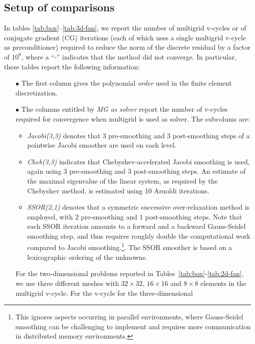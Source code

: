 \documentclass[smallcondensed,final]{svjour3}     %
\begin{document}
\subsection{Setup of comparisons}\label{subsec:measures}
In tables \ref{tab:box}--\ref{tab:3d-fan}, we report the number of
multigrid v-cycles or of conjugate gradient (CG) iterations (each of
which uses a single multigrid v-cycle as preconditioner) required to
reduce the norm of the discrete residual by a factor of $10^8$, where
a ``-'' indicates that the method did not converge. In particular,
these tables report the following information:
\begin{itemize}
\item[$\bullet$] The first column gives the polynomial \emph{order}
  used in the finite element discretization.
\item[$\bullet$] The columns entitled by \emph{MG as solver} report
  the number of v-cycles required for convergence when multigrid is used as
  solver. The subcolums are:
  \begin{itemize}
  \item \emph{Jacobi(3,3)} denotes that 3 pre-smoothing and 3
    post-smoothing steps of a pointwise Jacobi smoother are used on
    each level.
  \item \emph{Cheb(3,3)} indicates that Chebyshev-accelerated Jacobi
    smoothing is used, again using 3 pre-smoothing and 3 post-smoothing
    steps. An estimate of the maximal eigenvalue of the linear system,
    as required by the Chebyshev method, is estimated using 10 Arnoldi
    iterations.
  \item \emph{SSOR(2,1)} denotes that a symmetric successive
    over-relaxation method is employed, with 2 pre-smoothing and 1
    post-smoothing steps. Note that each SSOR
    iteration amounts to a forward and a backward Gauss-Seidel
    smoothing step, and thus
    requires  roughly double the computational work compared to Jacobi
    smoothing.\footnote{This ignores aspects occurring in parallel
      environments, where Gauss-Seidel smoothing can
      be challenging to implement and requires more communication in
      distributed memory environments.}. The SSOR smoother is based on 
			a lexicographic ordering of  the unknowns. 
  \end{itemize}
    For the two-dimensional problems reported in
    Tables~\ref{tab:box}-\ref{tab:2d-fan}, we use three different
    meshes with $32\times32$, $16\times16$ and $8\times8$ elements in
    the multigrid v-cycle. For the v-cycle for the three-dimensional

\end{itemize}
\end{document}

